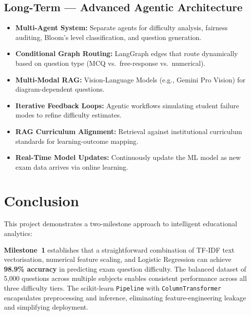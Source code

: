 \documentclass[12pt, a4paper, twoside]{article}
\newcommand{\code}[1]{\texttt{#1}}
\begin{document}
\subsection{Long-Term --- Advanced Agentic Architecture}

\begin{itemize}[leftmargin=2em]
    \item \textbf{Multi-Agent System:} Separate agents for difficulty
          analysis, fairness auditing, Bloom's level classification,
          and question generation.
    \item \textbf{Conditional Graph Routing:} LangGraph edges that
          route dynamically based on question type (MCQ vs.\
          free-response vs.\ numerical).
    \item \textbf{Multi-Modal RAG:} Vision-Language Models (e.g.,
          Gemini Pro Vision) for diagram-dependent questions.
    \item \textbf{Iterative Feedback Loops:} Agentic workflows
          simulating student failure modes to refine difficulty
          estimates.
    \item \textbf{RAG Curriculum Alignment:} Retrieval against
          institutional curriculum standards for learning-outcome
          mapping.
    \item \textbf{Real-Time Model Updates:} Continuously update the
          ML model as new exam data arrives via online learning.
\end{itemize}

\section{Conclusion}\label{sec:conclusion}

This project demonstrates a two-milestone approach to intelligent
educational analytics:

\textbf{Milestone~1} establishes that a straightforward combination of
TF-IDF text vectorisation, numerical feature scaling, and Logistic
Regression can achieve \textbf{98.9\% accuracy} in predicting exam
question difficulty. The balanced dataset of 5{,}000 questions across
multiple subjects enables consistent performance across all three
difficulty tiers. The scikit-learn \code{Pipeline} with
\code{ColumnTransformer} encapsulates preprocessing and inference,
eliminating feature-engineering leakage and simplifying deployment.
\end{document}
